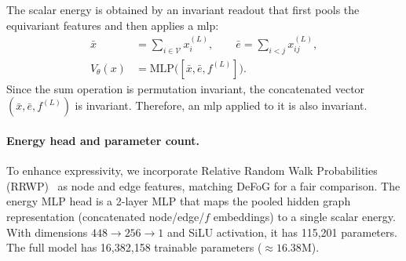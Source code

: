 The scalar energy is obtained by an invariant readout that first pools the
equivariant features and then applies a \gls{mlp}:
\begin{equation}
\begin{aligned}
\bar{x} &= \sum_{i\in\mathcal{V}} x^{(L)}_i,\qquad
\bar{e} = \sum_{i< j} x^{(L)}_{ij},\\
V_\theta(x) &= \mathrm{MLP}\big([\bar{x},\bar{e},f^{(L)}]\big).
\end{aligned}
\end{equation}
Since the sum operation is permutation invariant, the concatenated vector
$(\bar{x},\bar{e},f^{(L)})$ is invariant. Therefore, an \gls{mlp} applied to it is
also invariant.

\paragraph{Energy head and parameter count.}
To enhance expressivity, we incorporate Relative Random Walk Probabilities (RRWP)~\citep{ma2023graph}
as node and edge features, matching DeFoG for a fair comparison. The energy MLP head is a 2-layer MLP
that maps the pooled hidden graph representation (concatenated node/edge/$f$ embeddings) to a single
scalar energy. With dimensions $448\to256\to1$ and SiLU activation, it has 115,201 parameters. The
full model has 16,382,158 trainable parameters ($\approx 16.38$M).
